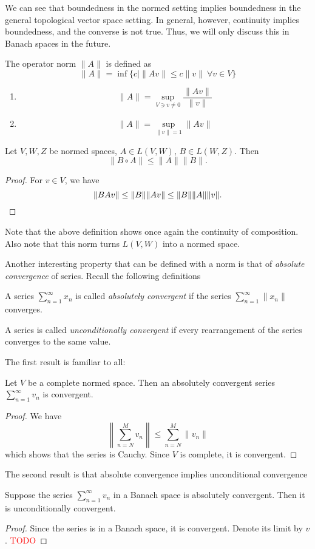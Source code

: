 \documentclass[twoside,symmetric, openany, 12pt]{./tuftebook}
\theoremstyle{definition}
\theoremstyle{definition}
\theoremstyle{definition}
\newenvironment{parts}{\begin{enumerate}[label=(\alph*)]}{\end{enumerate}}
\begin{document}
We can see that boundedness in the normed setting implies boundedness in the general topological vector space setting. In general, however, continuity implies boundedness, and the converse is not true. Thus, we will only discuss this in Banach spaces in the future. 
	\begin{Definition}
		The operator norm $\|A\|$ is defined as
		\[\|A\|=\inf \{c| \|Av\| \le c\|v\|~\forall v\in V\}\]
	\end{Definition}
	\begin{Corollary}\noindent
		\begin{parts}
			\item \[\|A\|=\sup_{V\ni v \neq 0}\frac{\|Av\|}{\|v\|}\]
			\item \[\|A\| = \sup_{\|v\|=1}\|A v\|\]
		\end{parts}
	\end{Corollary}
	\begin{Theorem}
		Let $V,W, Z$ be normed spaces, $A\in L(V,W)$, $B\in L(W,Z)$. Then
		\[\|B\circ A\| \le \|A\| \|B\|.\]
	\end{Theorem}
\begin{proof}
	For $v\in V$, we have
	\[\|BAv\|\le \|B\| \|Av\| \le \|B\| \|A\| \|v\|.\qedhere\]
\end{proof}
Note that the above definition shows once again the continuity of composition. Also note that this norm turns $L(V,W)$ into a normed space.

Another interesting property that can be defined with a norm is that of \emph{absolute convergence} of series. Recall the following definitions
\begin{Definition}
	A series $\displaystyle\sum_{n=1}^\infty x_n$ is called \emph{absolutely convergent} if the series $\displaystyle\sum_{n=1}^\infty \|x_n\|$ converges.
\end{Definition}
\begin{Definition}
	A series is called \emph{unconditionally convergent} if every rearrangement of the series converges to the same value.
\end{Definition}
The first result is familiar to all:
\begin{Proposition}
Let $V$ be a complete normed space. Then an absolutely convergent series $\displaystyle \sum_{n=1}^\infty v_n$ is convergent.
\end{Proposition}
\begin{proof}
	We have
	\[\left\|\sum_{n=N}^M v_n \right\| \le \sum_{n=N}^M \| v_n\|\]
	which shows that the series is Cauchy. Since $V$ is complete, it is convergent.  
\end{proof}
The second result is that absolute convergence implies unconditional convergence
\begin{Theorem}
	Suppose the series $\sum_{n=1}^\infty v_n$ in a Banach space is absolutely convergent. Then it is unconditionally convergent.
\end{Theorem} 
\begin{proof}
	Since the series is in a Banach space, it is convergent. Denote its limit by $v$. \textcolor{red}{TODO}
\end{proof}
\end{document}

